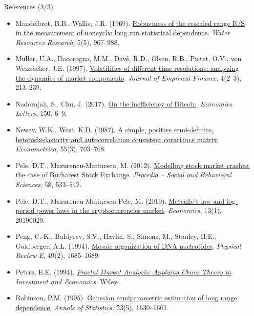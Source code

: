 \begin{frame}{References (3/3)}
\itemsize{\tiny}
\begin{itemize}
    \item Mandelbrot, B.B., Wallis, J.R. (1969). \href{https://doi.org/10.1029/WR005i005p00967}{Robustness of the rescaled range R/S in the measurement of noncyclic long run statistical dependence}. \textit{Water Resources Research}, 5(5), 967--988.
    \item Müller, U.A., Dacorogna, M.M., Davé, R.D., Olsen, R.B., Pictet, O.V., von Weizsäcker, J.E. (1997). \href{https://doi.org/10.1016/S0927-5398(97)00007-8}{Volatilities of different time resolutions: analyzing the dynamics of market components}. \textit{Journal of Empirical Finance}, 4(2--3), 213--239.
    \item Nadarajah, S., Chu, J. (2017). \href{https://doi.org/10.1016/j.econlet.2016.10.033}{On the inefficiency of Bitcoin}. \textit{Economics Letters}, 150, 6--9.
    \item Newey, W.K., West, K.D. (1987). \href{https://doi.org/10.2307/1913610}{A simple, positive semi-definite, heteroskedasticity and autocorrelation consistent covariance matrix}. \textit{Econometrica}, 55(3), 703--708.
    \item Pele, D.T., Mazurencu-Marinescu, M. (2012). \href{https://doi.org/10.1016/j.sbspro.2012.09.1030}{Modelling stock market crashes: the case of Bucharest Stock Exchange}. \textit{Procedia -- Social and Behavioral Sciences}, 58, 533--542.
    \item Pele, D.T., Mazurencu-Marinescu-Pele, M. (2019). \href{https://doi.org/10.5018/economics-ejournal.ja.2019-29}{Metcalfe's law and log-period power laws in the cryptocurrencies market}. \textit{Economics}, 13(1), 20190029.
    \item Peng, C.-K., Buldyrev, S.V., Havlin, S., Simons, M., Stanley, H.E., Goldberger, A.L. (1994). \href{https://doi.org/10.1103/PhysRevE.49.1685}{Mosaic organization of DNA nucleotides}. \textit{Physical Review E}, 49(2), 1685--1689.
    \item Peters, E.E. (1994). \href{https://www.wiley.com/en-us/Fractal+Market+Analysis\%3A+Applying+Chaos+Theory+to+Investment+and+Economics-p-9780471585244}{\textit{Fractal Market Analysis: Applying Chaos Theory to Investment and Economics}}. Wiley.
    \item Robinson, P.M. (1995). \href{https://doi.org/10.1214/aos/1176324317}{Gaussian semiparametric estimation of long range dependence}. \textit{Annals of Statistics}, 23(5), 1630--1661.

\end{itemize}
\end{frame}
